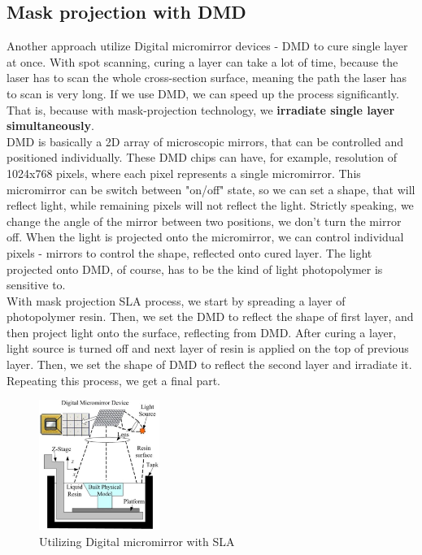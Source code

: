 \documentclass[a4paper, twoside, 11pt]{report}
\begin{document}
\subsection{Mask projection with DMD}
Another approach utilize Digital micromirror devices - DMD to cure single layer at once. With spot scanning, curing a layer can take a lot of time, because the laser has to scan the whole cross-section surface, meaning the path the laser has to scan is very long. If we use DMD, we can speed up the process significantly. That is, because with mask-projection technology, we \textbf{irradiate single layer simultaneously}.\\
DMD is basically a 2D array of microscopic mirrors, that can be controlled and positioned individually. These DMD chips can have, for example, resolution of 1024x768 pixels, where each pixel represents a single micromirror. This micromirror can be switch between "on/off" state, so we can set a shape, that will reflect light, while remaining pixels will not reflect the light. Strictly speaking, we change the angle of the mirror between two positions, we don't turn the mirror off. When the light is projected onto the micromirror, we can control individual pixels - mirrors to control the shape, reflected onto cured layer. The light projected onto DMD, of course, has to be the kind of light photopolymer is sensitive to.\\
With mask projection SLA process, we start by spreading a layer of photopolymer resin. Then, we set the DMD to reflect the shape of first layer, and then project light onto the surface, reflecting from DMD. After curing a layer, light source is turned off and next layer of resin is applied on the top of previous layer. Then, we set the shape of DMD to reflect the second layer and irradiate it. Repeating this process, we get a final part.\\
%
\begin{figure}
 	\includegraphics[width=0.35\textwidth, angle=180]{DMD}
	\caption{Utilizing Digital micromirror with SLA}
\end{figure}
\end{document}
